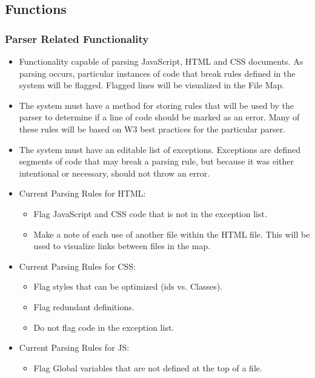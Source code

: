 \documentclass[letterpaper,10pt,titlepage,draftclsnofoot,onecolumn,onesided] {IEEEtran}
\begin{document}
\subsection{Functions}

\subsubsection{Parser Related Functionality}
\begin{itemize}
	\item Functionality capable of parsing JavaScript, HTML and CSS documents. As parsing occurs, particular instances of code that break rules defined in the system will be flagged. Flagged lines will be visualized in the File Map.
	\item The system must have a method for storing rules that will be used by the parser to determine if a line of code should be marked as an error. Many of these rules will be based on W3 best practices for the particular parser.
	\item The system must have an editable list of exceptions. Exceptions are defined segments of code that may break a parsing rule, but because it was either intentional or necessary, should not throw an error.
	\item Current Parsing Rules for HTML:
		\begin{itemize}
			\item Flag JavaScript and CSS code that is not in the exception list.
			\item Make a note of each use of another file within the HTML file. This will be used to visualize links between files in the map.
		\end{itemize}
	\item Current Parsing Rules for CSS:
		\begin{itemize}
			\item Flag styles that can be optimized (ids vs. Classes).
			\item Flag redundant definitions.
			\item Do not flag code in the exception list.
		\end{itemize}
	\item Current Parsing Rules for JS:
		\begin{itemize}
			\item Flag Global variables that are not defined at the top of a file.
		\end{itemize}
\end{itemize}
\end{document}
